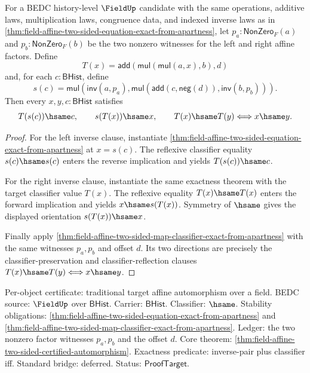 \begin{theorem}
\label{thm:field-affine-two-sided-certified-automorphism}
For a BEDC history-level $\FieldUp$ candidate with the same operations,
additive laws, multiplication laws, congruence data, and indexed inverse laws
as in
\autoref{thm:field-affine-two-sided-equation-exact-from-apartness}, let
$p_a:\mathsf{NonZero}_F(a)$ and $p_b:\mathsf{NonZero}_F(b)$ be the two
nonzero witnesses for the left and right affine factors. Define
$$
T(x)=\mathsf{add}(\mathsf{mul}(\mathsf{mul}(a,x),b),d)
$$
and, for each $c:\mathsf{BHist}$, define
$$
s(c)=
\mathsf{mul}(\mathsf{inv}(a,p_a),
\mathsf{mul}(\mathsf{add}(c,\mathsf{neg}(d)),\mathsf{inv}(b,p_b))).
$$
Then every $x,y,c:\mathsf{BHist}$ satisfies
$$
T(s(c))\hsame c,
\qquad
s(T(x))\hsame x,
\qquad
T(x)\hsame T(y)\Longleftrightarrow x\hsame y.
$$
\end{theorem}
\begin{proof}
For the left inverse clause, instantiate
\autoref{thm:field-affine-two-sided-equation-exact-from-apartness} at
$x=s(c)$. The reflexive classifier equality $s(c)\hsame s(c)$ enters the
reverse implication and yields $T(s(c))\hsame c$.

For the right inverse clause, instantiate the same exactness theorem with the
target classifier value $T(x)$. The reflexive equality $T(x)\hsame T(x)$ enters
the forward implication and yields $x\hsame s(T(x))$. Symmetry of $\hsame$
gives the displayed orientation $s(T(x))\hsame x$.

Finally apply
\autoref{thm:field-affine-two-sided-map-classifier-exact-from-apartness} with
the same witnesses $p_a,p_b$ and offset $d$. Its two directions are precisely
the classifier-preservation and classifier-reflection clauses
$T(x)\hsame T(y)\Longleftrightarrow x\hsame y$.
\end{proof}

Per-object certificate: traditional target affine automorphism over a field.
BEDC source: $\FieldUp$ over $\mathsf{BHist}$. Carrier:
$\mathsf{BHist}$. Classifier: $\hsame$. Stability obligations:
\autoref{thm:field-affine-two-sided-equation-exact-from-apartness} and
\autoref{thm:field-affine-two-sided-map-classifier-exact-from-apartness}.
Ledger: the two nonzero factor witnesses $p_a,p_b$ and the offset $d$. Core
theorem: \autoref{thm:field-affine-two-sided-certified-automorphism}. Exactness
predicate: inverse-pair plus classifier iff. Standard bridge: deferred. Status:
$\mathsf{ProofTarget}$.

